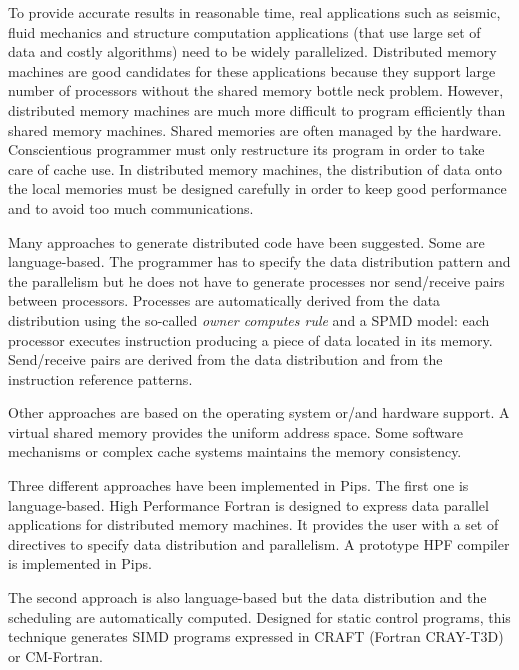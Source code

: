 
%


To provide accurate results in reasonable time, real applications such
as seismic, fluid mechanics and structure computation applications (that
use large set of data and costly algorithms) need to be widely
parallelized. Distributed memory machines are good candidates for these
applications because they support large number of processors without
the shared memory bottle neck problem.  However, distributed memory machines
are much more difficult to program efficiently than shared memory machines.  Shared memories are
often managed by the hardware. Conscientious programmer must only
restructure its program in order to take care of  cache use.
In distributed memory machines, the distribution of data onto the local 
memories must be designed  carefully in order to keep good performance and 
to avoid too much communications.

Many approaches to generate distributed code have been suggested.
Some are language-based. The programmer has to specify the data
distribution pattern and the parallelism but he does not have to
generate processes nor send/receive pairs between processors.
Processes are automatically derived from the data distribution using
the so-called {\em owner computes rule} and a SPMD model: each
processor executes instruction producing a piece of data located in
its memory.  Send/recei\-ve pairs are derived from the data
distribution and from the instruction reference patterns.


Other approaches are  based on the operating system or/and 
hardware support. A virtual shared memory provides the uniform address space.
Some software mechanisms or complex cache systems maintains the memory consistency.


Three different approaches have been implemented in Pips. The first one
is language-based. High Performance Fortran is designed to express data
parallel applications for distributed memory machines. It provides the
user with  a set of directives to specify data distribution and parallelism. A prototype  HPF compiler  is implemented in Pips.

The second  approach is also language-based but the data  distribution and the scheduling are 
automatically computed. Designed for static control programs, this technique
 generates SIMD programs expressed  in CRAFT (Fortran CRAY-T3D) or CM-Fortran.

